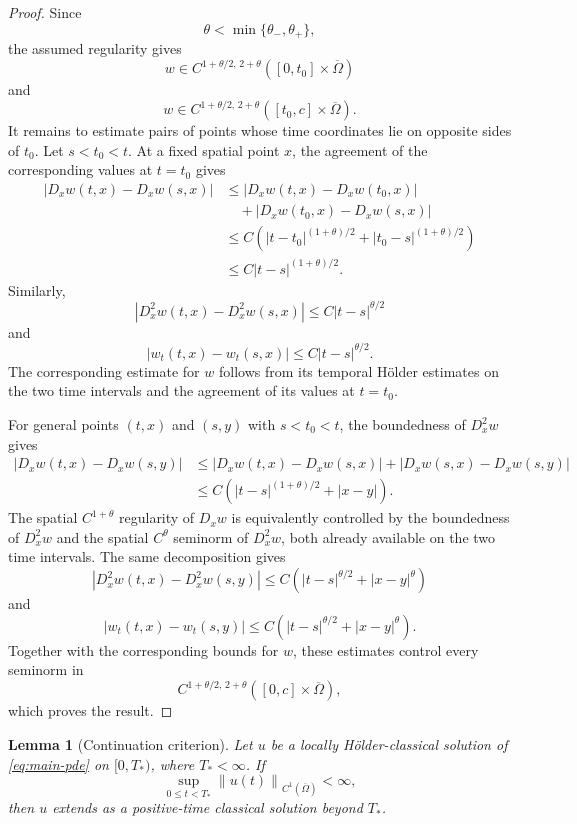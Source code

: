 \documentclass[11pt]{article}
\newtheorem{lemma}[theorem]{Lemma}
\theoremstyle{remark}
\newcommand{\norm}[1]{\left\lVert #1\right\rVert}
\begin{document}
\begin{proof}
Since
\[
\theta<\min\{\theta_-,\theta_+\},
\]
the assumed regularity gives
\[
w\in C^{1+\theta/2,\,2+\theta}
([0,t_0]\times\overline{\Omega})
\]
and
\[
w\in C^{1+\theta/2,\,2+\theta}
([t_0,c]\times\overline{\Omega}).
\]
It remains to estimate pairs of points whose time coordinates lie on opposite sides of $t_0$. Let $s<t_0<t$. At a fixed spatial point $x$, the agreement of the corresponding values at $t=t_0$ gives
\[
\begin{aligned}
|D_xw(t,x)-D_xw(s,x)|
&\leq |D_xw(t,x)-D_xw(t_0,x)| \\
&\quad+|D_xw(t_0,x)-D_xw(s,x)| \\
&\leq C\left(|t-t_0|^{(1+\theta)/2}+|t_0-s|^{(1+\theta)/2}\right) \\
&\leq C|t-s|^{(1+\theta)/2}.
\end{aligned}
\]
Similarly,
\[
|D_x^2w(t,x)-D_x^2w(s,x)|\leq C|t-s|^{\theta/2}
\]
and
\[
|w_t(t,x)-w_t(s,x)|\leq C|t-s|^{\theta/2}.
\]
The corresponding estimate for $w$ follows from its temporal H\"older estimates on the two time intervals and the agreement of its values at $t=t_0$.

For general points $(t,x)$ and $(s,y)$ with $s<t_0<t$, the boundedness of $D_x^2w$ gives
\[
\begin{aligned}
|D_xw(t,x)-D_xw(s,y)|
&\leq |D_xw(t,x)-D_xw(s,x)|+|D_xw(s,x)-D_xw(s,y)| \\
&\leq C\left(|t-s|^{(1+\theta)/2}+|x-y|\right).
\end{aligned}
\]
The spatial $C^{1+\theta}$ regularity of $D_xw$ is equivalently controlled by the boundedness of $D_x^2w$ and the spatial $C^\theta$ seminorm of $D_x^2w$, both already available on the two time intervals. The same decomposition gives
\[
|D_x^2w(t,x)-D_x^2w(s,y)|
\leq C\left(|t-s|^{\theta/2}+|x-y|^\theta\right)
\]
and
\[
|w_t(t,x)-w_t(s,y)|
\leq C\left(|t-s|^{\theta/2}+|x-y|^\theta\right).
\]
Together with the corresponding bounds for $w$, these estimates control every seminorm in
\[
C^{1+\theta/2,\,2+\theta}([0,c]\times\overline{\Omega}),
\]
which proves the result.
\end{proof}

\begin{lemma}[Continuation criterion]\label{lem:continuation}
Let $u$ be a locally H\"older-classical solution of \eqref{eq:main-pde} on $[0,T_*)$, where $T_*<\infty$.  If
\[
        \sup_{0\le t<T_*}\norm{u(t)}_{C^1(\overline\Omega)}<\infty,
\]
then $u$ extends as a positive-time classical solution beyond $T_*$.
\end{lemma}
\end{document}
